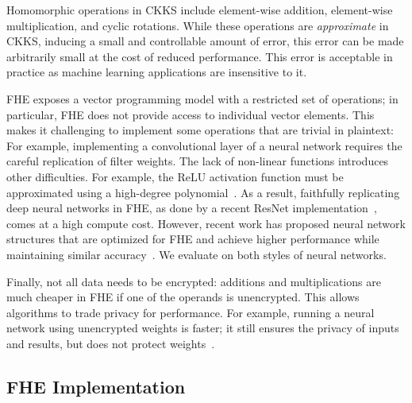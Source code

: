 Homomorphic operations in CKKS include element-wise addition, element-wise multiplication,
and cyclic rotations.
While these operations are \emph{approximate} in CKKS, inducing a small and
controllable amount of error, this error can be made arbitrarily small at the
cost of reduced performance. %
This error is acceptable in practice as machine learning applications
are insensitive to it.

FHE exposes a vector programming model with a restricted set of operations; in particular,
FHE does not provide access to individual vector elements.
This makes it challenging to implement some operations
that are trivial in plaintext:
For example,
implementing a convolutional layer of a neural network requires the careful
replication of filter weights.
The lack of non-linear functions introduces other difficulties.
For example, the ReLU activation function must be approximated
using a high-degree polynomial~\cite{lee:2021:precise}.
%
As a result, faithfully replicating deep neural networks in FHE,
as done by a recent ResNet implementation~\cite{lee:2021:privacy}, comes at a high compute cost.
However, recent work has proposed neural network structures that are optimized
for FHE and achieve higher performance while maintaining similar accuracy~\cite{brutzkus:icml19:low}.
We evaluate \name on both styles of neural networks.

Finally, not all data needs to be encrypted:
additions and multiplications are much cheaper in FHE if one of the operands is unencrypted.
This allows algorithms to trade privacy for performance.
For example, running a neural network using unencrypted weights is faster; it
still ensures the privacy of inputs and results, but does not
protect weights~\cite{brutzkus:icml19:low}.

\subsection{FHE Implementation}

